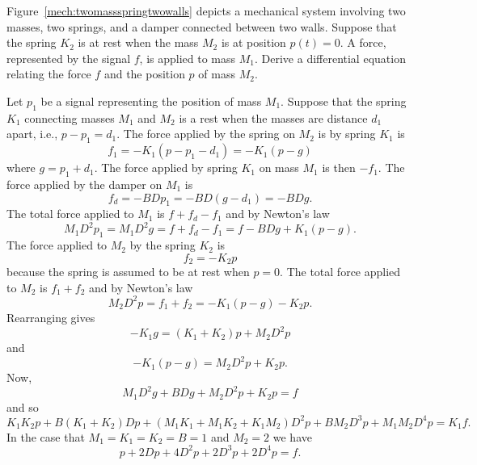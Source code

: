 \begin{excersizelist}
\begin{solution}
\end{solution}


\item \label{exer:twomassspringtwowalls} Figure~\ref{mech:twomassspringtwowalls} depicts a mechanical system involving two masses, two springs, and a damper connected between two walls.  Suppose that the spring $K_2$ is at rest when the mass $M_2$ is at position $p(t) = 0$.  A force, represented by the signal $f$, is applied to mass $M_1$.  Derive a differential equation relating the force $f$ and the position $p$ of mass $M_2$.

\begin{solution}
Let $p_1$ be a signal representing the position of mass $M_1$.  Suppose that the spring $K_1$ connecting masses $M_1$ and $M_2$ is a rest when the masses are distance $d_1$ apart, i.e., $p - p_1 = d_1$.  The force applied by the spring on $M_2$ is by spring $K_1$ is 
\[
f_1 = -K_1(p - p_1 - d_1) = -K_1(p - g)
\] 
where $g = p_1 + d_1$.  The force applied by spring $K_1$ on mass $M_1$ is then $-f_1$.  The force applied by the damper on $M_1$ is
\[
f_d = -BD p_1 = -BD(g - d_1) = - BD g.
\]
The total force applied to $M_1$ is $f + f_d - f_1$ and by Newton's law
\[
M_1 D^2 p_1 = M_1 D^2g = f + f_d - f_1 = f - BDg + K_1(p - g).
\]
The force applied to $M_2$ by the spring $K_2$ is
\[
f_2 = -K_2 p 
\] 
because the spring is assumed to be at rest when $p = 0$.  The total force applied to $M_2$ is $f_1 + f_2$ and by Newton's law
\[
M_2 D^2p = f_1 + f_2 =  -K_1(p - g) - K_2p.
\]
Rearranging gives
\[
-K_1 g = (K_1+K_2)p + M_2 D^2p
\]
and
\[
-K_1(p - g) = M_2 D^2p  + K_2p .
\]
Now,
\[
M_1 D^2g + BDg + M_2 D^2p  + K_2p = f 
\]
and so
\[
K_1K_2 p + B(K_1+K_2)Dp + (M_1K_1 + M_1K_2 + K_1 M_2) D^2p  + BM_2D^3p + M_1M_2 D^4p = K_1 f .
\]
In the case that $M_1 = K_1 = K_2 = B = 1$ and $M_2 = 2$ we have
\[
p + 2Dp + 4D^2p + 2D^3p + 2D^4p = f.
\]
\end{solution}

\begin{figure}[p]
\centering
{}
\end{figure}
\end{excersizelist}
